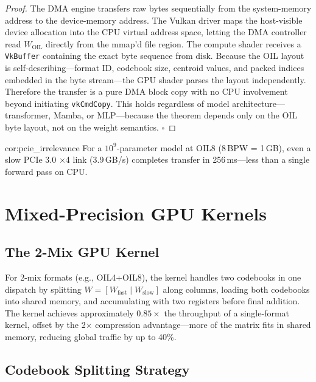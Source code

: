 \begin{proof}
The DMA engine transfers raw bytes sequentially from the system-memory address
to the device-memory address. The Vulkan driver maps the host-visible device
allocation into the CPU virtual address space, letting the DMA controller read
$W_{\mathrm{OIL}}$ directly from the mmap'd file region. The compute shader
receives a \texttt{VkBuffer} containing the exact byte sequence from disk.
Because the OIL layout is self-describing---format ID, codebook size, centroid
values, and packed indices embedded in the byte stream---the GPU shader parses
the layout independently. Therefore the transfer is a pure DMA block copy with
no CPU involvement beyond initiating \texttt{vkCmdCopy}. This holds regardless
of model architecture---transformer, Mamba, or MLP---because the theorem
depends only on the OIL byte layout, not on the weight semantics. $\square$
\end{proof}

\begin{mycor}{cor:pcie_irrelevance}
For a $10^9$-parameter model at OIL8 (8\,BPW = 1\,GB), even a slow PCIe 3.0
$\times$4 link (3.9\,GB/s) completes transfer in 256\,ms---less than a single
forward pass on CPU.
\end{mycor}

\section{Mixed-Precision GPU Kernels}
\label{sec:gpu_mixed}

\subsection{The 2-Mix GPU Kernel}

For 2-mix formats (e.g., OIL4+OIL8), the kernel handles two codebooks in one
dispatch by splitting $W = [W_{\mathrm{fast}} \mid W_{\mathrm{slow}}]$ along
columns, loading both codebooks into shared memory, and accumulating with two
registers before final addition. The kernel achieves approximately $0.85\times$
the throughput of a single-format kernel, offset by the 2$\times$ compression
advantage---more of the matrix fits in shared memory, reducing global traffic
by up to 40\%.

\subsection{Codebook Splitting Strategy}

